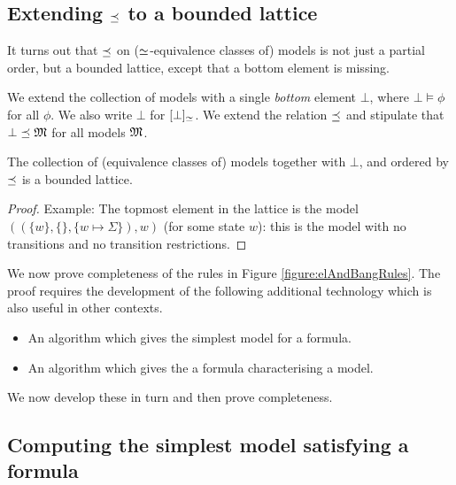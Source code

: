 \subsection{Extending $\preceq$ to a bounded lattice}

It turns out that $\preceq $ on ($\simeq$-equivalence classes of)
models is not just a partial order, but a bounded lattice, except
that a bottom element is missing.

\begin{definition}
We extend the collection of models with a single \emph{bottom} element
$\bot$, where $\bot \models \phi$ for all $\phi$. We also write $\bot$
for $[\bot]_{\simeq}$.  We extend the relation $\preceq $ and
stipulate that $\bot \preceq \frak{M}$ for all models $\frak{M}$.
\end{definition}

\begin{theorem}
The collection of (equivalence classes of) models together with
$\bot$, and ordered by $\preceq$ is a bounded lattice.
\end{theorem}
\begin{proof}
  Example: The topmost element in the
lattice is the model $( (\{w\}, \{\}, \{w \mapsto \Sigma\}), w)$ (for
some state $w$): this is the model with no transitions and no
transition restrictions.
\end{proof}

\NI We now prove completeness of the rules in Figure
\ref{figure:elAndBangRules}.  The proof requires the development of
the following additional technology which is also useful in other
contexts.

\begin{itemize}

\item An algorithm which gives the simplest model for a formula.

\item An algorithm which gives the a formula characterising a model.

\end{itemize}

\NI We now develop these  in turn and then prove completeness.

\subsection{Computing the simplest model satisfying a formula}
\label{simpl}

